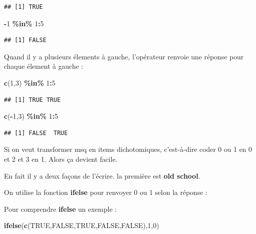 \documentclass[
]{book}
\newenvironment{Shaded}{\begin{snugshade}}{\end{snugshade}}
\newcommand{\ConstantTok}[1]{\textcolor[rgb]{0.56,0.35,0.01}{#1}}
\newcommand{\DecValTok}[1]{\textcolor[rgb]{0.00,0.00,0.81}{#1}}
\newcommand{\FunctionTok}[1]{\textcolor[rgb]{0.13,0.29,0.53}{\textbf{#1}}}
\newcommand{\NormalTok}[1]{#1}
\newcommand{\SpecialCharTok}[1]{\textcolor[rgb]{0.81,0.36,0.00}{\textbf{#1}}}
\begin{document}
\begin{verbatim}
## [1] TRUE
\end{verbatim}

\begin{Shaded}
\begin{Highlighting}[]
\SpecialCharTok{{-}}\DecValTok{1} \SpecialCharTok{\%in\%} \DecValTok{1}\SpecialCharTok{:}\DecValTok{5}
\end{Highlighting}
\end{Shaded}

\begin{verbatim}
## [1] FALSE
\end{verbatim}

Quand il y a plusieurs élements à gauche, l'opérateur renvoie une réponse pour
chaque élement à gauche :

\begin{Shaded}
\begin{Highlighting}[]
\FunctionTok{c}\NormalTok{(}\DecValTok{1}\NormalTok{,}\DecValTok{3}\NormalTok{) }\SpecialCharTok{\%in\%} \DecValTok{1}\SpecialCharTok{:}\DecValTok{5}
\end{Highlighting}
\end{Shaded}

\begin{verbatim}
## [1] TRUE TRUE
\end{verbatim}

\begin{Shaded}
\begin{Highlighting}[]
\FunctionTok{c}\NormalTok{(}\SpecialCharTok{{-}}\DecValTok{1}\NormalTok{,}\DecValTok{3}\NormalTok{) }\SpecialCharTok{\%in\%} \DecValTok{1}\SpecialCharTok{:}\DecValTok{5}
\end{Highlighting}
\end{Shaded}

\begin{verbatim}
## [1] FALSE  TRUE
\end{verbatim}

Si on veut transformer msq en items dichotomiques, c'est-à-dire coder 0 ou 1 en
0 et 2 et 3 en 1. Alors ça devient facile.

En fait il y a deux façons de l'écrire. la première est \textbf{old school}.

On utilise la fonction \textbf{ifelse} pour renvoyer 0 ou 1 selon la réponse :

Pour comprendre \textbf{ifelse} un exemple :

\begin{Shaded}
\begin{Highlighting}[]
\FunctionTok{ifelse}\NormalTok{(}\FunctionTok{c}\NormalTok{(}\ConstantTok{TRUE}\NormalTok{,}\ConstantTok{FALSE}\NormalTok{,}\ConstantTok{TRUE}\NormalTok{,}\ConstantTok{FALSE}\NormalTok{,}\ConstantTok{FALSE}\NormalTok{),}\DecValTok{1}\NormalTok{,}\DecValTok{0}\NormalTok{)}
\end{Highlighting}
\end{Shaded}
\end{document}
